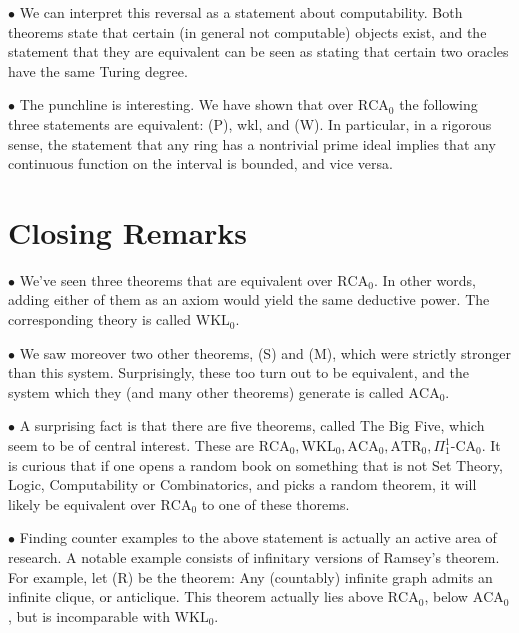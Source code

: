 \documentclass{article}
\theoremstyle{nonumberplain}
\newcommand{\RCA}{\mathrm{RCA}}
\newcommand{\WKL}{\mathrm{WKL}}
\newcommand{\ACA}{\mathrm{ACA}}
\newcommand\point[1]{\noindent \hspace{\labelsep} $\bullet$ #1 \smallskip}
\begin{document}
\point{We can interpret this reversal as a statement about computability. Both theorems state that certain (in general not computable) objects exist, and the statement that they are equivalent can be seen as stating that certain two oracles have the same Turing degree.}

\point{The punchline is interesting. We have shown that over $\RCA_0$ the following three statements are equivalent: (P), wkl, and (W). In particular, in a rigorous sense, the statement that any ring has a nontrivial prime ideal implies that any continuous function on the interval is bounded, and vice versa.}

\section{Closing Remarks}

\point{We've seen three theorems that are equivalent over $\RCA_0$. In other words, adding either of them as an axiom would yield the same deductive power. The corresponding theory is called $\WKL_0$.}

\point{We saw moreover two other theorems, (S) and (M), which were strictly stronger than this system. Surprisingly, these too turn out to be equivalent, and the system which they (and many other theorems) generate is called $\ACA_0$.}

\point{A surprising fact is that there are five theorems, called The Big Five, which seem to be of central interest. These are $\RCA_0, \WKL_0, \ACA_0, \mathrm{ATR}_0, \Pi^1_1\text{-}\mathrm{CA}_0$. It is curious that if one opens a random book on something that is not Set Theory, Logic, Computability or Combinatorics, and picks a random theorem, it will likely be equivalent over $\RCA_0$ to one of these thorems.}

\point{Finding counter examples to the above statement is actually an active area of research. A notable example consists of infinitary versions of Ramsey's theorem. For example, let (R) be the theorem: Any (countably) infinite graph admits an infinite clique, or anticlique. This theorem actually lies above $\RCA_0$, below $\ACA_0$, but is incomparable with $\WKL_0$.}
\end{document}
